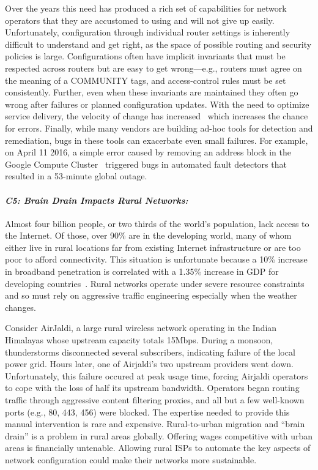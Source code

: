 Over the years this need has produced a rich set of capabilities for network operators that they are accustomed to using and will not give up easily. Unfortunately, configuration through individual router settings is inherently difficult to understand and get right, as the space of possible routing and security policies is large. Configurations often have implicit invariants that must be respected across routers but are easy to get wrong---e.g., routers must agree on the meaning of a COMMUNITY tags, and access-control rules must be set consistently. Further, even when these invariants are maintained they often go wrong after failures or planned configuration updates. With the need to optimize service delivery, the velocity of change has increased~\cite{rameshgoogle} which increases the chance for errors.  Finally, while many vendors are building ad-hoc tools for detection and remediation, bugs in these tools can exacerbate even small failures.  For example, on April 11 2016, a simple error caused by removing an address block in the Google Compute Cluster~\cite{googlefailure} triggered bugs in automated fault detectors that resulted in a 53-minute global outage.  

\paragraph*{\em C5: Brain Drain Impacts Rural Networks:} Almost four
billion people, or two thirds of the world’s population, lack access
to the Internet. Of those, over 90\% are in the developing world, many
of whom either live in rural locations far from existing Internet
infrastructure or are too poor to afford connectivity. This situation
is unfortunate because a 10\% increase in broadband penetration is
correlated with a 1.35\% increase in GDP for developing
countries~\cite{perez,qiang}.  Rural networks operate under severe
resource constraints and so must rely on aggressive traffic
engineering especially when the weather changes.

Consider AirJaldi, a large rural wireless network operating in the Indian Himalayas whose upstream capacity totals 15Mbps.  During a monsoon,  thunderstorms disconnected several subscribers, indicating failure of the local power grid. Hours later, one of Airjaldi's two upstream providers went down.  Unfortunately, this failure occured at peak usage time, forcing Airjaldi operators to cope with the loss of half its upstream bandwidth. Operators began routing traffic through aggressive content filtering proxies, and all but a few well-known ports (e.g., 80, 443, 456) were blocked. The expertise needed to provide this manual intervention is rare and expensive.  Rural-to-urban migration and ``brain drain'' is a problem in rural areas globally. Offering wages competitive with urban areas is financially untenable.   Allowing rural ISPs to automate the key aspects of network configuration could make their networks more sustainable.

